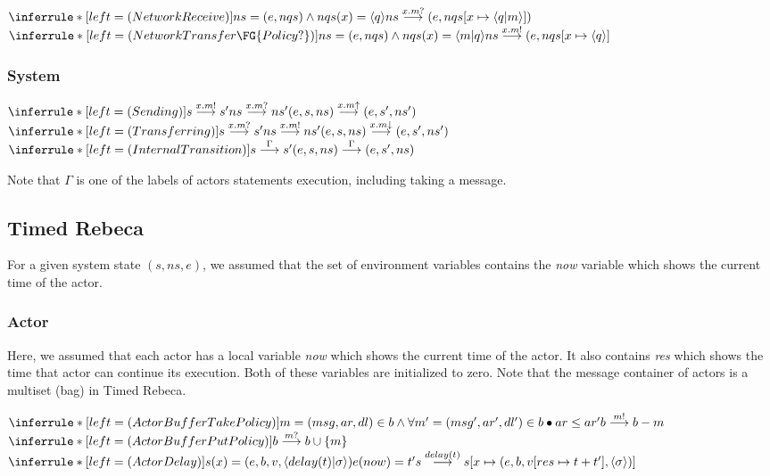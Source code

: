 \noindent
$\inferrule*[left = (Network Receive)]{ns=(e, nqs) \wedge nqs(x)=\langle q \rangle}{ns \overset{x.m?}{\longrightarrow}(e, nqs[x \mapsto \langle q | m \rangle])}$\\
$\inferrule*[left = (Network Transfer \FG{Policy?})]{ns=(e, nqs) \wedge nqs(x)=\langle m | q \rangle}{ns \overset{x.m!}{\longrightarrow}(e, nqs[x \mapsto \langle q\rangle]}$\\


\subsubsection{System}
$\inferrule*[left = (Sending)]{s \overset{x.m!}{\longrightarrow} s' \\ ns \overset{x.m?}{\longrightarrow} ns'}{(e, s, ns) \overset{x.m\uparrow}{\longrightarrow}(e, s', ns')}$\\
$\inferrule*[left = (Transferring)]{s \overset{x.m?}{\longrightarrow} s' \\ ns \overset{x.m!}{\longrightarrow} ns'}{(e, s, ns) \overset{x.m \downarrow}{\longrightarrow}(e, s', ns')}$\\
$\inferrule*[left = (Internal Transition)]{ s \overset{\Gamma}{\longrightarrow} s'}{(e, s, ns) \overset{\Gamma}{\longrightarrow}(e, s', ns)}$

Note that $\Gamma$ is one of the labels of actors statements execution, including taking a message.


\subsection{Timed Rebeca}
For a given system state $(s, ns, e)$, we assumed that the set of environment variables contains the \emph{now} variable which shows the current time of the actor.
\subsubsection{Actor}
Here, we assumed that each actor has a local variable \emph{now} which shows the current time of the actor. It also contains \emph{res} which shows the time that actor can continue its execution. Both of these variables are initialized to zero. Note that the message container of actors is a multiset (bag) in Timed Rebeca.

\noindent
$\inferrule*[left = (Actor Buffer Take Policy)]{m=(msg, ar, dl) \in b \wedge \forall m'=(msg', ar', dl') \in b \bullet ar \leq ar'}{b \overset{m!}{\longrightarrow}b-m}$\\
$\inferrule*[left = (Actor Buffer Put Policy)]{}{b \overset{m?}{\longrightarrow}b \cup \{m\}}$\\
$\inferrule*[left = (Actor Delay)]{s(x)=(e, b, v, \langle delay(t)| \sigma \rangle) \\ e(now)=t'}{s \overset{delay(t)}{\longrightarrow}s[x \mapsto (e, b, v[res \mapsto t + t'], \langle \sigma \rangle)]}$

